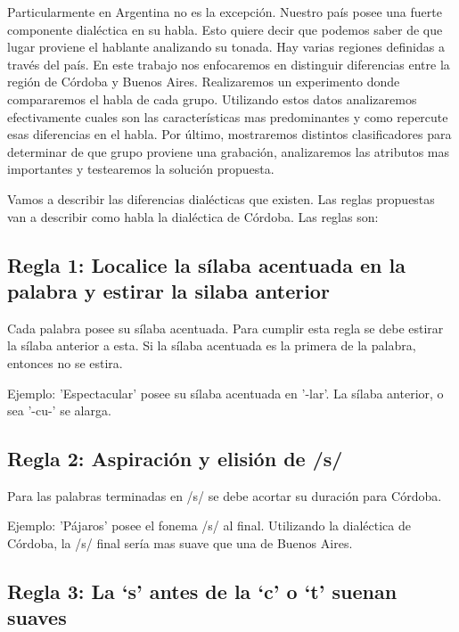 \documentclass[11pt,a4paper,twoside]{tesis}
\begin{document}
Particularmente en Argentina no es la excepción. Nuestro país posee una fuerte componente dialéctica en su habla. Esto quiere decir que podemos saber de que lugar proviene el hablante analizando su tonada. Hay varias regiones definidas a través del país. En este trabajo nos enfocaremos en distinguir diferencias entre la región de Córdoba y Buenos Aires. Realizaremos un experimento donde compararemos el habla de cada grupo. Utilizando estos datos analizaremos efectivamente cuales son las características mas predominantes y como repercute esas diferencias en el habla. Por último, mostraremos distintos clasificadores para determinar de que grupo proviene una grabación, analizaremos las atributos mas importantes y testearemos la solución propuesta. 

Vamos a describir las diferencias dialécticas que existen. Las reglas propuestas van a describir como habla la dialéctica de Córdoba. Las reglas son: 

\subsection*{Regla 1: Localice la sílaba acentuada en la palabra y estirar la silaba anterior}

Cada palabra posee su sílaba acentuada. Para cumplir esta regla se debe estirar la sílaba anterior a esta. Si la sílaba acentuada es la primera de la palabra, entonces no se estira. 

Ejemplo: 'Espectacular' posee su sílaba acentuada en '-lar'. La sílaba anterior, o sea '-cu-' se alarga. 


\subsection*{Regla 2: Aspiración y elisión de /s/}

Para las palabras terminadas en /s/ se debe acortar su duración para Córdoba. 

Ejemplo: 'Pájaros' posee el fonema /s/ al final. Utilizando la dialéctica de Córdoba, la /s/ final sería mas suave que una de Buenos Aires. 

\subsection*{Regla 3: La ‘s’ antes de la ‘c’ o ‘t’ suenan suaves}
\end{document}
